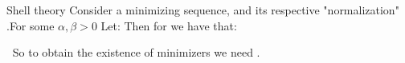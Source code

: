 \documentclass{beamer}
\newcommand{\bul}{{\color{structure}\textbullet}}
\begin{document}
\begin{frame}{Shell theory}
    Consider a minimizing sequence,  and its respective "normalization" .\pause For some $\alpha,\beta>0$ Let:
    \pause
    Then for  we have that:

    \bul$\ $ So to obtain the existence of minimizers we need .
\end{frame}
\end{document}
